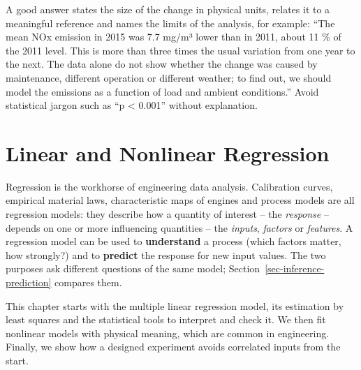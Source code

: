\documentclass[
  letterpaper,
  DIV=11,
  numbers=noendperiod]{scrreprt}
\begin{document}
\begin{tcolorbox}[enhanced jigsaw, left=2mm, title=\textcolor{quarto-callout-caution-color}{\faFire}\hspace{0.5em}{Solution to Exercise 7}, opacityback=0, breakable, rightrule=.15mm, arc=.35mm, toptitle=1mm, colbacktitle=quarto-callout-caution-color!10!white, opacitybacktitle=0.6, coltitle=black, colframe=quarto-callout-caution-color-frame, bottomrule=.15mm, leftrule=.75mm, bottomtitle=1mm, titlerule=0mm, toprule=.15mm, colback=white]

A good answer states the size of the change in physical units, relates
it to a meaningful reference and names the limits of the analysis, for
example: ``The mean NOx emission in 2015 was 7.7 mg/m³ lower than in
2011, about 11 \% of the 2011 level. This is more than three times the
usual variation from one year to the next. The data alone do not show
whether the change was caused by maintenance, different operation or
different weather; to find out, we should model the emissions as a
function of load and ambient conditions.'' Avoid statistical jargon such
as ``p \textless{} 0.001'' without explanation.

\end{tcolorbox}

\chapter{Linear and Nonlinear
Regression}\label{linear-and-nonlinear-regression}

Regression is the workhorse of engineering data analysis. Calibration
curves, empirical material laws, characteristic maps of engines and
process models are all regression models: they describe how a quantity
of interest -- the \emph{response} -- depends on one or more influencing
quantities -- the \emph{inputs}, \emph{factors} or \emph{features}. A
regression model can be used to \textbf{understand} a process (which
factors matter, how strongly?) and to \textbf{predict} the response for
new input values. The two purposes ask different questions of the same
model; Section~\ref{sec-inference-prediction} compares them.

This chapter starts with the multiple linear regression model, its
estimation by least squares and the statistical tools to interpret and
check it. We then fit nonlinear models with physical meaning, which are
common in engineering. Finally, we show how a designed experiment avoids
correlated inputs from the start.
\end{document}
